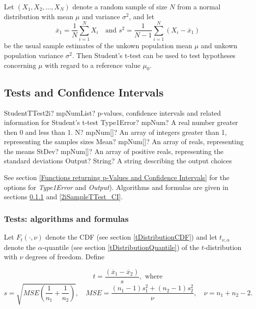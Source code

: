 Let $(X_1, X_2, \ldots, X_N)$ denote a random sample of size $N$ from a normal distribution with mean $\mu$ and variance $\sigma^2$, and let
\begin{equation}
	\overline{x}_1 = \frac{1}{N} \sum_{i=1}^N X_i \quad \text{and } s^2 = \frac{1}{N-1} \sum_{i=1}^N (X_i - \overline{x}_1)
\end{equation}
be the usual sample estimates of the unkown population mean $\mu$ and unkown population variance $\sigma^2$. Then Student's t-test can be used to test hypotheses concerning $\mu$ with regard to a reference value $\mu_0$.



\subsection{Tests and Confidence Intervals}

\begin{mpFunctionsExtract}
	\mpFunctionFiveNotImplemented
	{StudentTTest2i? mpNumList? p-values, confidence intervals and related information for Student's t-test}
	{Type1Error? mpNum? A real number greater then 0 and less than 1.}
	{N? mpNum[]? An array of integers greater than 1, representing the samples sizes}
	{Mean? mpNum[]? An array of reals, representing the means}
	{StDev? mpNum[]? An array of positive reals, representing the standard deviations}
	{Output? String? A string describing the output choices}
\end{mpFunctionsExtract}

\vspace{0.3cm}
See section \ref{Functions returning p-Values and Confidence Intervals} for the options for {\itshape\sffamily Type1Error} and {\itshape\sffamily Output}). Algorithms and formulas are given in sections \ref{2iSampleTTest_Test} and \ref{2iSampleTTest_CI}.



\subsubsection{Tests: algorithms and formulas}
\label{2iSampleTTest_Test}
Let $F_t\left(\cdot, \nu\right)$ denote the CDF (see section \ref{tDistributionCDF}) and let $t_{\nu,\alpha}$ denote the $\alpha$-quantile (see section \ref{tDistributionQuantile}) of the $t$-distribution with $\nu$ degrees of freedom. Define

\begin{equation}
	t= \frac{(\overline{x}_1-\overline{x}_2)}{s}, \text{ where}
\end{equation}
\begin{equation} \label{eq:TTest2i}
	s = \sqrt{\textit{MSE}\left(\frac{1}{n_1}+\frac{1}{n_2}\right)}, \quad \textit{MSE} = \frac{(n_1-1)s_1^2+(n_2-1)s_2^2}{\nu}, \quad \nu=n_1+n_2-2.
\end{equation}


